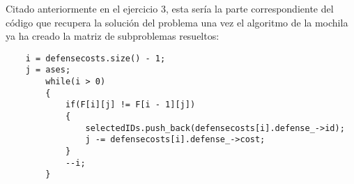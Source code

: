 Citado anteriormente en el ejercicio 3, esta sería la parte correspondiente del código que recupera la solución del problema una vez el algoritmo de la mochila ya ha creado la matriz de subproblemas resueltos:

\begin{lstlisting}
    i = defensecosts.size() - 1;
    j = ases;
        while(i > 0)
        {
            if(F[i][j] != F[i - 1][j])
            {
                selectedIDs.push_back(defensecosts[i].defense_->id);
                j -= defensecosts[i].defense_->cost;
            }
            --i;
        }
\end{lstlisting}